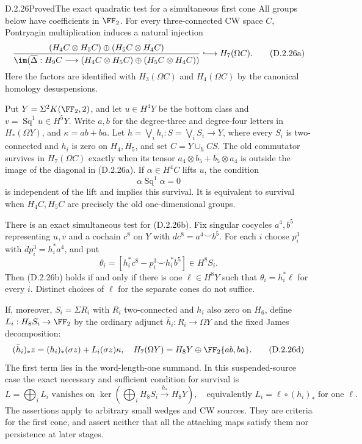 \begin{claim}{D.2.26}{Proved}{The exact quadratic test for a simultaneous first cone}
All groups below have coefficients in $\FF_2$.
For every three-connected CW space $C$, Pontryagin multiplication
induces a natural injection
\[
 \frac{(H_4C\otimes H_5C)\oplus(H_5C\otimes H_4C)}
 {\im(\overline\Delta:H_9C\longrightarrow
                (H_4C\otimes H_5C)\oplus(H_5C\otimes H_4C))}
 \lhook\joinrel\longrightarrow H_7(\Omega C).
 \tag{D.2.26a}
\]
Here the factors are identified with $H_3(\Omega C)$ and
$H_4(\Omega C)$ by the canonical homology desuspensions.

Put $Y=\Sigma^2K(\FF_2,2)$, and let $u\in H^4Y$ be the
bottom class and $v=\operatorname{Sq}^1u\in H^5Y$.
Write $a,b$ for the degree-three and degree-four letters in
$H_*(\Omega Y)$, and $\kappa=ab+ba$.
Let $h=\bigvee_i h_i:S=\bigvee_i S_i\to Y$, where every $S_i$
is two-connected and $h_i$ is zero on $H_4,H_5$, and set
$C=Y\cup_h CS$. The old commutator survives in $H_7(\Omega C)$
exactly when its tensor $a_4\otimes b_5+b_5\otimes a_4$ is
outside the image of the diagonal in \textup{(D.2.26a)}.
If $\alpha\in H^4C$ lifts $u$, the condition
\[
 \alpha\operatorname{Sq}^1\alpha=0
 \tag{D.2.26b}
\]
is independent of the lift and implies this survival. It is
equivalent to survival when $H_4C,H_5C$ are precisely the old
one-dimensional groups.

There is an exact simultaneous test for \textup{(D.2.26b)}.
Fix singular cocycles $a^4,b^5$ representing $u,v$ and a cochain
$c^8$ on $Y$ with $dc^8=a^4\smile b^5$. For each $i$ choose
$p_i^3$ with $dp_i^3=h_i^*a^4$, and put
\[
 \theta_i=[h_i^*c^8-p_i^3\smile h_i^*b^5]\in H^8S_i.
 \tag{D.2.26c}
\]
Then \textup{(D.2.26b)} holds if and only if there is one
$\ell\in H^8Y$ such that $\theta_i=h_i^*\ell$ for every $i$.
Distinct choices of $\ell$ for the separate cones do not suffice.

If, moreover, $S_i=\Sigma R_i$ with $R_i$ two-connected and
$h_i$ also zero on $H_6$, define $L_i:H_8S_i\to\FF_2$ by the
ordinary adjunct $\bar h_i:R_i\to\Omega Y$ and the fixed
James decomposition:
\[
 (\bar h_i)_*z=(h_i)_*(\sigma z)+L_i(\sigma z)\kappa,
 \quad
 H_7(\Omega Y)=H_8Y\oplus\FF_2\{ab,ba\}.
 \tag{D.2.26d}
\]
The first term lies in the word-length-one summand. In this
suspended-source case the exact necessary and sufficient condition
for survival is
\[
 L=\bigoplus_iL_i\text{ vanishes on }
 \ker\!\left(\bigoplus_iH_8S_i\xrightarrow{h_*}H_8Y\right),
 \quad\text{equivalently }L_i=\ell\circ(h_i)_*\text{ for one }\ell.
 \tag{D.2.26e}
\]
The assertions apply to arbitrary small wedges and CW sources.
They are criteria for the first cone, and assert neither that
all the attaching maps satisfy them nor persistence at later stages.
\end{claim}

